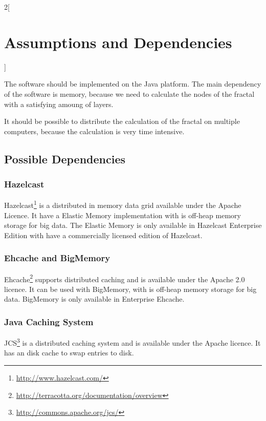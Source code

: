 \begin{multicols}{2}[\section{Assumptions and Dependencies}]

The software should be implemented on the Java platform. The main dependency
of the software is memory, because we need to calculate the nodes of the fractal
with a satisfying amoung of layers.

It should be possible to distribute the calculation of the fractal on multiple
computers, because the calculation is very time intensive.

\subsection{Possible Dependencies}

\subsubsection{Hazelcast}

Hazelcast\footnote{\url{http://www.hazelcast.com/}}
is a distributed in memory data grid available under the Apache Licence.
It have a Elastic Memory implementation with is off-heap memory storage for big
data. The Elastic Memory is only available in Hazelcast Enterprise Edition with
have a commercially licensed edition of Hazelcast.

\subsubsection{Ehcache and BigMemory}

Ehcache\footnote{\url{http://terracotta.org/documentation/overview}}
supports distributed caching and is available under the Apache 2.0 licence.
It can be used with BigMemory, with is off-heap memory storage for big
data. BigMemory is only available in Enterprise Ehcache.

\subsubsection{Java Caching System}

JCS\footnote{\url{http://commons.apache.org/jcs/}}
is a distributed caching system and is available under the Apache licence.
It has an disk cache to swap entries to disk.
 
\end{multicols}

